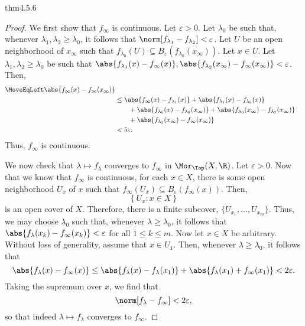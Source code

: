 \begin{thm}{}{thm4.5.6}
\begin{proof}
We first show that $f_\infty$ is continuous.  Let $\varepsilon >0$.  Let $\lambda _0$ be such that, whenever $\lambda _1,\lambda _2\geq \lambda _0$, it follows that $\norm[f_{\lambda _1}-f_{\lambda _2}]<\varepsilon$.  Let $U$ be an open neighborhood of $x_\infty$ such that $f_{\lambda _0}(U)\subseteq B_{\varepsilon}(f_{\lambda _0}(x_\infty ))$.  Let $x\in U$.  Let $\lambda _1,\lambda _2\geq \lambda _0$ be such that $\abs{f_{\lambda _1}(x)-f_\infty (x)},\abs{f_{\lambda _2}(x_\infty )-f_\infty (x_\infty )}<\varepsilon$.  Then,
\begin{equation}
\begin{split}
\MoveEqLeft
\abs{f_\infty (x)-f_\infty (x_\infty )} \\
& \leq \abs{f_\infty (x)-f_{\lambda _1}(x)}+\abs{f_{\lambda _1}(x)-f_{\lambda _0}(x)} \\ & \qquad +\abs{f_{\lambda _0}(x)-f_{\lambda _0}(x_\infty )}+\abs{f_{\lambda _0}(x_\infty )-f_{\lambda _2}(x_\infty )} \\ & \qquad +\abs{f_{\lambda _2}(x_\infty )-f_\infty (x_\infty )} \\
& <5\varepsilon .
\end{split}
\end{equation}
Thus, $f_\infty$ is continuous.

We now check that $\lambda \mapsto f_\lambda$ converges to $f_\infty$ in $\Mor _{\Top}(X,\R )$.  Let $\varepsilon >0$.  Now that we know that $f_\infty$ is continuous, for each $x\in X$, there is some open neighborhood $U_x$ of $x$ such that $f_\infty (U_x)\subseteq B_{\varepsilon}(f_\infty (x))$.  Then, 
\begin{equation}
\left\{ U_x:x\in X\right\} 
\end{equation}
is an open cover of $X$.  Therefore, there is a finite subcover, $\{U_{x_1},\ldots ,U_{x_m}\}$.  Thus, we may choose $\lambda _0$ such that, whenever $\lambda \geq \lambda _0$, it follows that $\abs{f_\lambda (x_k)-f_\infty (x_k)}<\varepsilon$ for all $1\leq k\leq m$.  Now let $x\in X$ be arbitrary.  Without loss of generality, assume that $x\in U_1$.  Then, whenever $\lambda \geq \lambda _0$, it follows that
\begin{equation}
\abs{f_\lambda (x)-f_\infty (x)}\leq \abs{f_\lambda (x)-f_\lambda (x_1)}+\abs{f_\lambda (x_1)+f_\infty (x_1)}<2\varepsilon .
\end{equation}
Taking the supremum over $x$, we find that
\begin{equation}
\norm[f_\lambda -f_\infty ]<2\varepsilon ,
\end{equation}
so that indeed $\lambda \mapsto f_\lambda$ converges to $f_\infty$.


\end{proof}
\end{thm}
